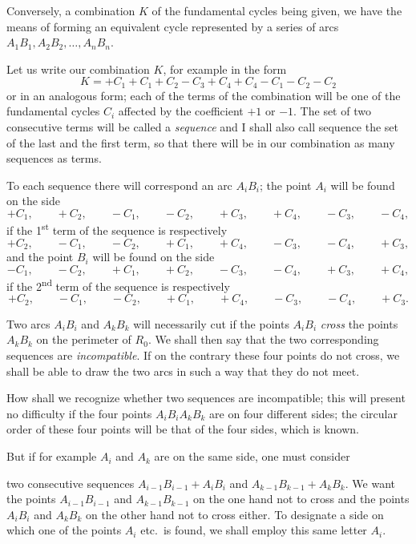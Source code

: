 \documentclass{article}
\begin{document}
Conversely, a combination $K$ of the fundamental cycles being given, we have the means of forming an equivalent cycle represented by a series of arcs $A_{1}B_{1}, A_{2}B_{2}, \ldots, A_{n}B_{n}$.

Let us write our combination $K$, for example in the form
\[ K = +C_{1} + C_{1} + C_{2} - C_{3} + C_{4} + C_{4} - C_{1} - C_{2} - C_{2} \]
or in an analogous form; each of the terms of the combination will be one of the fundamental cycles $C_{i}$ affected by the coefficient $+1$ or $-1$. The set of two consecutive terms will be called a \emph{sequence} and I shall also call sequence the set of the last and the first term, so that there will be in our combination as many sequences as terms.

To each sequence there will correspond an arc $A_{i}B_{i}$; the point $A_{i}$ will be found on the side
\[ +C_{1}, \qquad +C_{2}, \qquad -C_{1}, \qquad -C_{2}, \qquad +C_{3}, \qquad +C_{4}, \qquad -C_{3}, \qquad -C_{4}, \]
if the 1\textsuperscript{st} term of the sequence is respectively
\[ +C_{2}, \qquad -C_{1}, \qquad -C_{2}, \qquad +C_{1}, \qquad +C_{4}, \qquad -C_{3}, \qquad -C_{4}, \qquad +C_{3}, \]
and the point $B_{i}$ will be found on the side
\[ -C_{1}, \qquad -C_{2}, \qquad +C_{1}, \qquad +C_{2}, \qquad -C_{3}, \qquad -C_{4}, \qquad +C_{3}, \qquad +C_{4}, \]
if the 2\textsuperscript{nd} term of the sequence is respectively
\[ +C_{2}, \qquad -C_{1}, \qquad -C_{2}, \qquad +C_{1}, \qquad +C_{4}, \qquad -C_{3}, \qquad -C_{4}, \qquad +C_{3}. \]

Two arcs $A_{i}B_{i}$ and $A_{k}B_{k}$ will necessarily cut if the points $A_{i}B_{i}$ \emph{cross} the points $A_{k}B_{k}$ on the perimeter of $R_{0}$. We shall then say that the two corresponding sequences are \emph{incompatible}. If on the contrary these four points do not cross, we shall be able to draw the two arcs in such a way that they do not meet.

How shall we recognize whether two sequences are incompatible; this will present no difficulty if the four points $A_{i}B_{i}A_{k}B_{k}$ are on four different sides; the circular order of these four points will be that of the four sides, which is known.

But if for example $A_{i}$ and $A_{k}$ are on the same side, one must consider

two consecutive sequences $A_{i-1}B_{i-1} + A_{i}B_{i}$ and $A_{k-1}B_{k-1} + A_{k}B_{k}$. We want the points $A_{i-1}B_{i-1}$ and $A_{k-1}B_{k-1}$ on the one hand not to cross and the points $A_{i}B_{i}$ and $A_{k}B_{k}$ on the other hand not to cross either. To designate a side on which one of the points $A_{i}$ etc.\ is found, we shall employ this same letter $A_{i}$.
\end{document}
